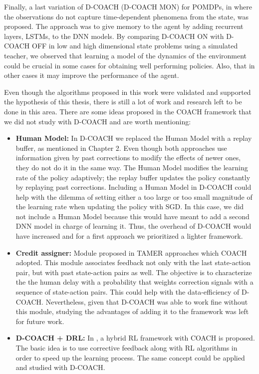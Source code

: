 Finally, a last variation of D-COACH (D-COACH MON) for POMDPs, in where the observations do not capture time-dependent phenomena from the state, was proposed. The approach was to give memory to the agent by adding recurrent layers, LSTMs, to the DNN models. By comparing D-COACH ON with D-COACH OFF in low and high dimensional state problems using a simulated teacher, we observed that learning a model of the dynamics of the environment could be crucial in some cases for obtaining well performing policies. Also, that in other cases it may improve the performance of the agent. 

Even though the algorithms proposed in this work were validated and supported the hypothesis of this thesis, there is still a lot of work and research left to be done in this area. There are some ideas proposed in the COACH framework that we did not study with D-COACH and are worth mentioning:

\begin{itemize}
    \item \textbf{Human Model:} In D-COACH we replaced the Human Model with a replay buffer, as mentioned in Chapter 2. Even though both approaches use information given by past corrections to modify the effects of newer ones, they do not do it in the same way. The Human Model modifies the learning rate of the policy adaptively; the replay buffer updates the policy constantly by replaying past corrections. Including a Human Model in D-COACH could help with the dilemma of setting either a too large or too small magnitude of the learning rate when updating the policy with SGD. In this case, we did not include a Human Model because this would have meant to add a second DNN model in charge of learning it. Thus, the overhead of D-COACH would have increased and for a first approach we prioritized a lighter framework.
    \item \textbf{Credit assigner:} Module proposed in TAMER approaches \cite{Knox:2009:ISA:1597735.1597738} which COACH adopted. This module associates feedback not only with the last state-action pair, but with past state-action pairs as well. The objective is to characterize the the human delay with a probability that weights correction signals with a sequence of state-action pairs. This could help with the data-efficiency of D-COACH. Nevertheless, given that D-COACH was able to work fine without this module, studying the advantages of adding it to the framework was left for future work. 
    \item \textbf{D-COACH + DRL:} In \cite{celemin2018fast}, a hybrid RL framework with COACH is proposed. The basic idea is to use corrective feedback along with RL algorithms in order to speed up the learning process. The same concept could be applied and studied with D-COACH. 
\end{itemize}

